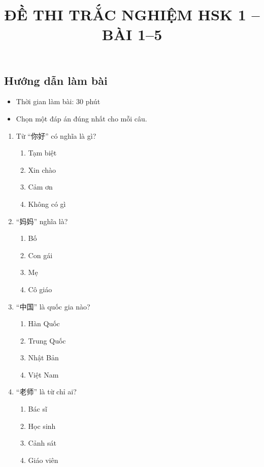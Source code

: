 \documentclass{article}
\title{\textbf{ĐỀ THI TRẮC NGHIỆM HSK 1 – BÀI 1–5}}
\author{}
\date{}
\begin{document}
\begin{CJK*}{UTF8}{gbsn}

\maketitle
\section*{Hướng dẫn làm bài}
\begin{itemize}
    \item Thời gian làm bài: 30 phút
    \item Chọn một đáp án đúng nhất cho mỗi câu.
\end{itemize}

\begin{multicols}{2}
\begin{enumerate}[label=\textbf{Câu \arabic*.}, leftmargin=*, itemsep=1.2em]

\item Từ “你好” có nghĩa là gì?
\begin{enumerate}[label=A.]
\item Tạm biệt
\item Xin chào
\item Cảm ơn
\item Không có gì
\end{enumerate}

\item “妈妈” nghĩa là?
\begin{enumerate}[label=A.]
\item Bố
\item Con gái
\item Mẹ
\item Cô giáo
\end{enumerate}

\item “中国” là quốc gia nào?
\begin{enumerate}[label=A.]
\item Hàn Quốc
\item Trung Quốc
\item Nhật Bản
\item Việt Nam
\end{enumerate}

\item “老师” là từ chỉ ai?
\begin{enumerate}[label=A.]
\item Bác sĩ
\item Học sinh
\item Cảnh sát
\item Giáo viên
\end{enumerate}


\end{enumerate}
\end{multicols}
\end{CJK*}
\end{document}
